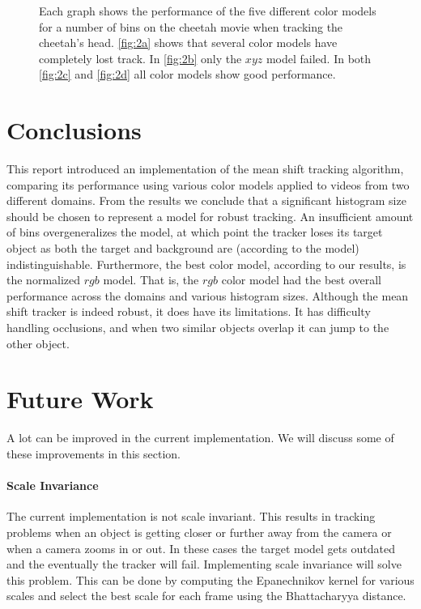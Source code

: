 \documentclass[11pt]{article}
\begin{document}
\begin{figure}[!ht]
{\label{fig:2d}
}
\caption{Each graph shows the performance of the five different color models for
a number of bins on the cheetah movie when tracking the cheetah's head.
\ref{fig:2a} shows that several color models have completely lost track. In
\ref{fig:2b} only the $xyz$ model failed. In both \ref{fig:2c} and \ref{fig:2d}
all color models show good performance.}
\label{fig:cheetah}
\end{figure}

\section{Conclusions} \label{sec:conclusion}
This report introduced an implementation of the mean shift tracking algorithm,
comparing its performance using various color models applied to videos from two
different domains.  From the results we conclude that a significant histogram
size should be chosen to represent a model for robust tracking. An insufficient
amount of bins overgeneralizes the model, at which point the tracker loses its
target object as both the target and background are (according to the model)
indistinguishable.  Furthermore, the best color model, according to our
results, is the normalized $rgb$ model. That is, the $rgb$ color model had the
best overall performance across the domains and various histogram sizes.
Although the mean shift tracker is indeed robust, it does have its limitations.
It has difficulty handling occlusions, and when two similar objects overlap it
can jump to the other object.

\section{Future Work} \label{sec:future}
A lot can be improved in the current implementation. We will discuss some of
these improvements in this section.

\paragraph{Scale Invariance} The current implementation is not scale invariant. This
results in tracking problems when an object is getting closer or further away
from the camera or when a camera zooms in or out. In these cases the target
model gets outdated and the eventually the tracker will fail. Implementing
scale invariance will solve this problem. This can be done by computing the
Epanechnikov kernel for various scales and select the best scale for each
frame using the Bhattacharyya distance.
\end{document}
